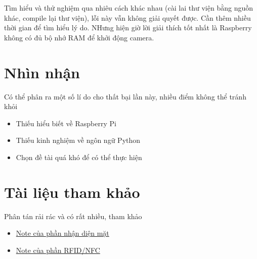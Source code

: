 Tìm hiểu và thử nghiệm qua nhiêu cách khác nhau (cài lai thư viện bằng
nguồn khác, compile lại thư viện), lỗi này vẫn không giải quyết được.
Cần thêm nhiều thời gian để tìm hiểu lý do. NHưng hiện giờ lời giải
thích tốt nhất là Raspberry không có đủ bộ nhớ RAM để khởi động camera.

\hypertarget{nhuxecn-nhux1eadn}{%
\section{Nhìn nhận}\label{nhuxecn-nhux1eadn}}

Có thể phân ra một số lí do cho thất bại lần này, nhiều điểm không thể
tránh khỏi

\begin{itemize}
\tightlist
\item
  Thiếu hiểu biết về Raspberry Pi
\item
  Thiếu kinh nghiệm về ngôn ngữ Python
\item
  Chọn đề tài quá khó để có thể thực hiện
\end{itemize}

\hypertarget{tuxe0i-liux1ec7u-tham-khux1ea3o}{%
\section{Tài liệu tham khảo}\label{tuxe0i-liux1ec7u-tham-khux1ea3o}}

Phân tán rải rác và có rất nhiều, tham khảo

\begin{itemize}
\tightlist
\item
  \href{https://github.com/ntpt7921/RaspPi_AttendanceSystem/blob/main/face_recognition/NOTE.md}{Note
  của phần nhận diện mặt}
\item
  \href{https://github.com/ntpt7921/RaspPi_AttendanceSystem/blob/main/nfc/NOTE.md}{Note
  của phần RFID/NFC}
\end{itemize}
